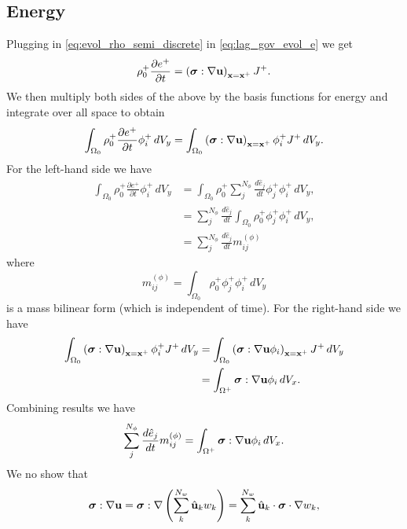 \documentclass[11pt]{article}
\begin{document}
\subsection{Energy}
Plugging in \cref{eq:evol_rho_semi_discrete} in \cref{eq:lag_gov_evol_e} we get
\begin{equation}
    \rho^+_0 \frac{\partial e^+}{\partial t} = \left ( \bm \sigma : \nabla \mathbf{u} \right )_{\mathbf{x} = \mathbf{x}^+} J^+.
\end{equation}
We then multiply both sides of the above by the basis functions for energy and integrate over all space to obtain
\begin{equation}
    \int_{\Omega_0} \rho^+_0 \frac{\partial e^+}{\partial t} \phi_i^+ \, dV_y = \int_{\Omega_0} \left ( \bm \sigma : \nabla \mathbf{u} \right )_{\mathbf{x} = \mathbf{x}^+} \phi_i^+ J^+ \, dV_y.
\end{equation}
For the left-hand side we have
\begin{align}
    \int_{\Omega_0} \rho^+_0 \frac{\partial e^+}{\partial t} \phi_i^+ \, dV_y &= \int_{\Omega_0} \rho^+_0 \sum_j^{N_\phi} \frac{d \hat{e}_j}{dt} \phi_j^+ \phi_i^+ \, dV_y , \nonumber \\
    &= \sum_j^{N_\phi} \frac{d \hat{e}_j}{dt} \int_{\Omega_0} \rho^+_0 \phi_j^+ \phi_i^+ \, dV_y , \nonumber \\
    &= \sum_j^{N_\phi} \frac{d \hat{e}_j}{dt} m_{ij}^{(\phi)}
\end{align}
where
\begin{equation}
    m_{ij}^{(\phi)} = \int_{\Omega_0} \rho^+_0 \phi_j^+ \phi_i^+ \, dV_y
\end{equation}
is a mass bilinear form (which is independent of time). For the right-hand side we have
\begin{align}
    \int_{\Omega_0} \left ( \bm \sigma : \nabla \mathbf{u} \right )_{\mathbf{x} = \mathbf{x}^+} \phi_i^+ J^+ \, dV_y &= \int_{\Omega_0} \left ( \bm \sigma : \nabla \mathbf{u} \phi_i \right )_{\mathbf{x} = \mathbf{x}^+} J^+ \, dV_y \nonumber \\
    &= \int_{\Omega^+} \bm \sigma : \nabla \mathbf{u} \phi_i \, dV_x. 
\end{align}
Combining results we have
\begin{equation}
    \sum_j^{N_\phi} \frac{d \hat{e}_j}{dt} m_{ij}^{(\phi)} = \int_{\Omega^+} \bm \sigma : \nabla \mathbf{u} \phi_i \, dV_x.
\end{equation}
We no show that
\begin{equation}
    \bm \sigma : \nabla \mathbf{u} = \bm \sigma : \nabla \left ( \sum_k^{N_w} \hat{\mathbf{u}}_k w_k \right ) = \sum_k^{N_w} \hat{\mathbf{u}}_k \cdot \bm \sigma \cdot \nabla w_k,
\end{equation}
\end{document}
